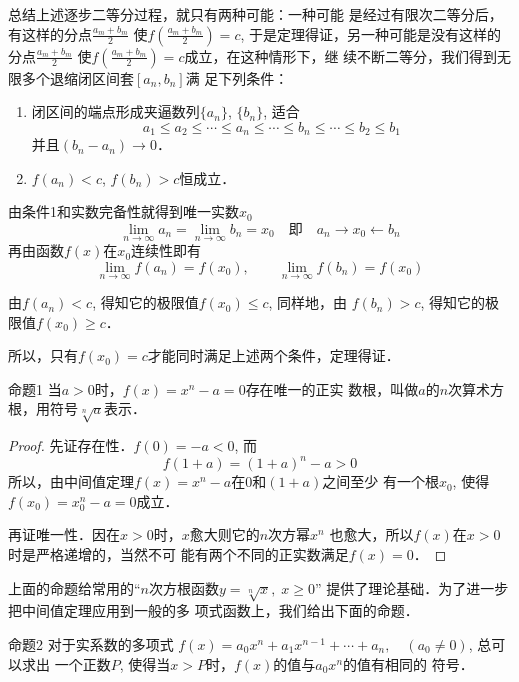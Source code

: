 总结上述逐步二等分过程，就只有两种可能：一种可能
是经过有限次二等分后，有这样的分点$\frac{a_m+b_m}{2}$
使$f\left(\frac{a_m+b_m}{2}\right)=c$, 于是定理得证，另一种可能是没有这样的
分点$\frac{a_m+b_m}{2}$
使$f\left(\frac{a_m+b_m}{2}\right)=c$成立，在这种情形下，继
续不断二等分，我们得到无限多个退缩闭区间套$[a_n,b_n]$满
足下列条件：

\begin{enumerate}
    \item 闭区间的端点形成夹逼数列$\{a_n\}$, $\{b_n\}$, 适合
    \[a_1\le a_2\le \cdots\le a_n\le \cdots \le b_n\le \cdots\le b_2\le b_1\]
并且$(b_n-a_n)\to 0$．
    \item $f(a_n)<c$, $f(b_n)>c$恒成立．

\end{enumerate}

    由条件1和实数完备性就得到唯一实数$x_0$
    \[\lim_{n\to\infty} a_n=\lim_{n\to\infty} b_n=x_0\quad \text{即}\quad a_n\to x_0\leftarrow b_n\]
    再由函数$f(x)$在$x_0$连续性即有
\[    \lim_{n\to\infty} f(a_n) = f(x_0),\qquad \lim_{n\to\infty} f(b_n)=f(x_0)\]

由$f(a_n)<c$, 得知它的极限值$f(x_0)\le c$, 同样地，由
    $f(b_n)>c$, 得知它的极限值$f(x_0)\ge c$．

所以，只有$f(x_0)=c$才能同时满足上述两个条件，定理得证．


\begin{blk}{命题1}
    当$a>0$时，$f(x)=x^n-a=0$存在唯一的正实
    数根，叫做$a$的$n$次算术方根，用符号$\sqrt[n]{a}$表示．
\end{blk}

\begin{proof}
    先证存在性．$f(0)=-a<0$, 而
\[f(1+a)=(1+a)^n-a>0\]
所以，由中间值定理$f(x)=x^n-a$在0和$(1+a)$之间至少
有一个根$x_0$, 使得$f(x_0)=x_0^n-a=0$成立．

再证唯一性．因在$x>0$时，$x$愈大则它的$n$次方幂$x^n$
也愈大，所以$f(x)$在$x>0$时是严格递增的，当然不可
能有两个不同的正实数满足$f(x)=0$．
\end{proof}

上面的命题给常用的“$n$次方根函数$y=\sqrt[n]{x},\; x\ge0$”
提供了理论基础．为了进一步把中间值定理应用到一般的多
项式函数上，我们给出下面的命题．

\begin{blk}{命题2 }
对于实系数的多项式
$f(x)=a_0x^n+a_1x^{n-1}+\cdots+a_n,\quad (a_0\ne 0)$, 总可以求出
一个正数$P$, 使得当$x>P$时，$f(x)$的值与$a_0x^n$的值有相同的
符号．
\end{blk}

